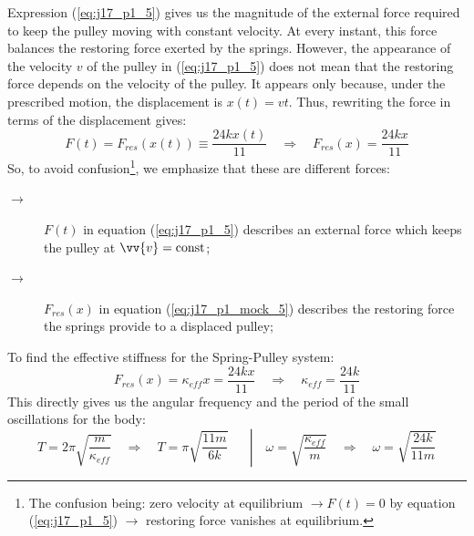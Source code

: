 Expression (\ref{eq:j17_p1_5}) gives us the magnitude of the external force required to keep the pulley moving with constant velocity. At every instant, this force balances the restoring force exerted by the springs. However, the appearance of the velocity $v$ of the pulley in (\ref{eq:j17_p1_5}) does not mean that the restoring force depends on the velocity of the pulley. It appears only because, under the prescribed motion, the displacement is \(x(t)=vt\). Thus, rewriting the force in terms of the displacement gives:
\begin{equation*}
	F(t) = F_{res}(x(t)) \equiv \frac{24kx(t)}{11}
	\quad\Rightarrow\quad
	F_{res}(x) = \frac{24kx}{11}
	\tag{$\star\star$}
	\label{eq:j17_p1_mock_5}
\end{equation*}
So, to avoid confusion\footnote{The confusion being: zero velocity at equilibrium $\rightarrow F(t) = 0$ by equation (\ref{eq:j17_p1_5}) $\rightarrow$ restoring force vanishes at equilibrium.}, we emphasize that these are different forces:
\begin{description}
	\item[$\rightarrow$] $F(t)$ in equation (\ref{eq:j17_p1_5}) describes an external force which keeps the pulley at $\vv{v} = \text{const}$;
	\item[$\rightarrow$] $F_{res}(x)$ in equation (\ref{eq:j17_p1_mock_5}) describes the restoring force the springs provide to a displaced pulley;
\end{description}
To find the effective stiffness for the Spring-Pulley system:
\begin{equation*}
	F_{res}(x) = \kappa_{eff} x = \frac{24kx}{11}
	\quad\Rightarrow\quad
	\boxed{\kappa_{eff} = \frac{24k}{11}}
	\tag{$6a$}
	\label{eq:j17_p1_6a}
\end{equation*}
This directly gives us the angular frequency and the period of the small oscillations for the body:
\begin{equation*}
	\left.
	T = 2 \pi \sqrt{\frac{m}{\kappa_{eff}}}
	\quad\Rightarrow\quad
	\boxed{T = \pi \sqrt{\frac{11m}{6k}}}
	\quad\,\,\,\,
	\right\vert
	\quad
	\omega = \sqrt{\frac{\kappa_{eff}}{m}}
	\quad\Rightarrow\quad
	\boxed{\omega = \sqrt{\frac{24k}{11m}}}
	\tag{$6b$}
	\label{eq:j17_p1_6b}
\end{equation*}
